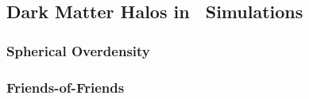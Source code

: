 \subsection{Dark Matter Halos in \nbody\ Simulations}
\label{subsec:halos_in_nbody_simulations}



\subsubsection{Spherical Overdensity}
\label{subsubsec:spherical_overdensity}



\subsubsection{Friends-of-Friends}
\label{subsubsec:friends-of-friends}




